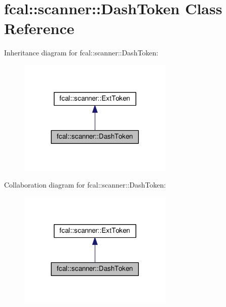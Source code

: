 \hypertarget{classfcal_1_1scanner_1_1DashToken}{}\section{fcal\+:\+:scanner\+:\+:Dash\+Token Class Reference}
\label{classfcal_1_1scanner_1_1DashToken}


Inheritance diagram for fcal\+:\+:scanner\+:\+:Dash\+Token\+:\nopagebreak
\begin{figure}[H]
\begin{center}
\leavevmode
\includegraphics[width=209pt]{classfcal_1_1scanner_1_1DashToken__inherit__graph}
\end{center}
\end{figure}


Collaboration diagram for fcal\+:\+:scanner\+:\+:Dash\+Token\+:\nopagebreak
\begin{figure}[H]
\begin{center}
\leavevmode
\includegraphics[width=209pt]{classfcal_1_1scanner_1_1DashToken__coll__graph}
\end{center}
\end{figure}
